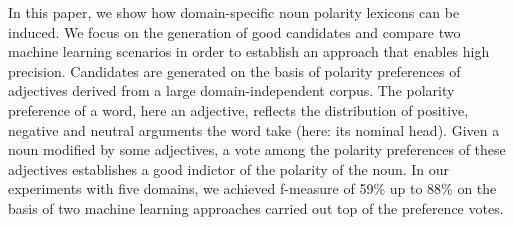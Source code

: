 In this paper, we show how domain-specific noun polarity lexicons can be induced. We focus on the generation of good candidates and compare two machine learning scenarios in order to establish an approach that enables high precision. Candidates are generated on the basis of polarity preferences of adjectives derived from a large domain-independent corpus. The polarity preference of a word, here an adjective, reflects the distribution of positive, negative and neutral arguments the word take  (here: its nominal head). Given a noun modified by some adjectives, a vote among the polarity preferences of these adjectives establishes  a good indictor of the polarity of the noun. In our experiments with five domains, we achieved f-measure of 59\% up to 88\% on the basis of two machine learning approaches carried out top of the preference votes.
